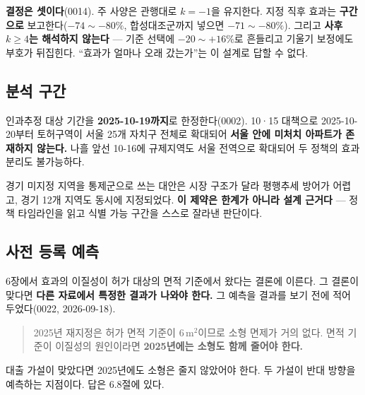 \textbf{결정은 셋이다}(0014). 주 사양은 관행대로 $k=-1$을 유지한다. 지정 직후
효과는 \textbf{구간으로} 보고한다($-74 \sim -80\%$, 합성대조군까지 넣으면
$-71 \sim -80\%$). 그리고 \textbf{사후 $k \geq 4$는 해석하지 않는다} --- 기준
선택에 $-20 \sim +16\%$로 흔들리고 기울기 보정에도 부호가 뒤집힌다. ``효과가
얼마나 오래 갔는가''는 이 설계로 답할 수 없다.

\subsection{분석 구간}

인과추정 대상 기간을 \textbf{2025-10-19까지}로 한정한다(0002). 10·15 대책으로
2025-10-20부터 토허구역이 서울 25개 자치구 전체로 확대되어 \textbf{서울 안에
미처치 아파트가 존재하지 않는다.} 나흘 앞선 10-16에 규제지역도 서울 전역으로
확대되어 두 정책의 효과 분리도 불가능하다.

경기 미지정 지역을 통제군으로 쓰는 대안은 시장 구조가 달라 평행추세 방어가
어렵고, 경기 12개 지역도 동시에 지정되었다. \textbf{이 제약은 한계가 아니라 설계
근거다} --- 정책 타임라인을 읽고 식별 가능 구간을 스스로 잘라낸 판단이다.

\subsection{사전 등록 예측}

6장에서 효과의 이질성이 허가 대상의 면적 기준에서 왔다는 결론에 이른다. 그
결론이 맞다면 \textbf{다른 자료에서 특정한 결과가 나와야 한다.} 그 예측을
결과를 보기 전에 적어 두었다(0022, 2026-09-18).

\begin{quote}
2025년 재지정은 허가 면적 기준이 6\,m$^2$이므로 소형 면제가 거의 없다.
면적 기준이 이질성의 원인이라면 \textbf{2025년에는 소형도 함께 줄어야 한다.}
\end{quote}

대출 가설이 맞았다면 2025년에도 소형은 줄지 않았어야 한다. 두 가설이 반대 방향을
예측하는 지점이다. 답은 6.8절에 있다.
